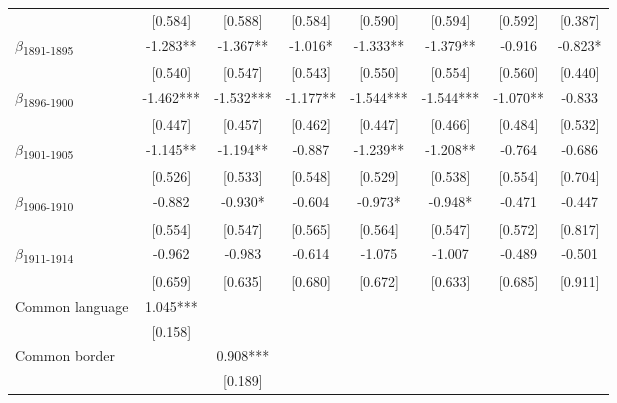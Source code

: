 {\begin{tabular}{l*{7}{c}}
            &     [0.584]   &     [0.588]   &     [0.584]   &     [0.590]   &     [0.594]   &     [0.592]   &     [0.387]   \\
$\beta$\textsubscript{1891-1895}&      -1.283** &      -1.367** &      -1.016*  &      -1.333** &      -1.379** &      -0.916   &      -0.823*  \\
            &     [0.540]   &     [0.547]   &     [0.543]   &     [0.550]   &     [0.554]   &     [0.560]   &     [0.440]   \\
$\beta$\textsubscript{1896-1900}&      -1.462***&      -1.532***&      -1.177** &      -1.544***&      -1.544***&      -1.070** &      -0.833   \\
            &     [0.447]   &     [0.457]   &     [0.462]   &     [0.447]   &     [0.466]   &     [0.484]   &     [0.532]   \\
$\beta$\textsubscript{1901-1905}&      -1.145** &      -1.194** &      -0.887   &      -1.239** &      -1.208** &      -0.764   &      -0.686   \\
            &     [0.526]   &     [0.533]   &     [0.548]   &     [0.529]   &     [0.538]   &     [0.554]   &     [0.704]   \\
$\beta$\textsubscript{1906-1910}&      -0.882   &      -0.930*  &      -0.604   &      -0.973*  &      -0.948*  &      -0.471   &      -0.447   \\
            &     [0.554]   &     [0.547]   &     [0.565]   &     [0.564]   &     [0.547]   &     [0.572]   &     [0.817]   \\
$\beta$\textsubscript{1911-1914}&      -0.962   &      -0.983   &      -0.614   &      -1.075   &      -1.007   &      -0.489   &      -0.501   \\
            &     [0.659]   &     [0.635]   &     [0.680]   &     [0.672]   &     [0.633]   &     [0.685]   &     [0.911]   \\
Common language&       1.045***&               &               &               &               &               &               \\
            &     [0.158]   &               &               &               &               &               &               \\
Common border&               &       0.908***&               &               &               &               &               \\
            &               &     [0.189]   &               &               &               &               &               \\

\end{tabular}}
